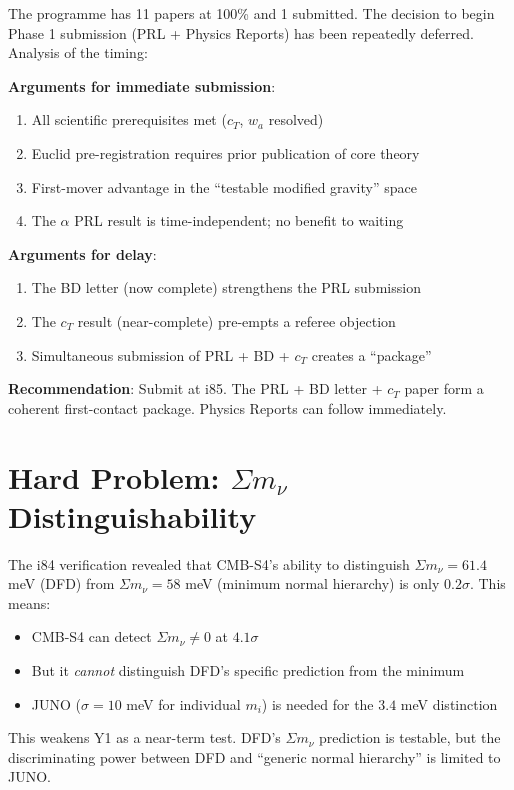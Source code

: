 \documentclass[11pt,a4paper]{article}
\begin{document}
The programme has 11 papers at 100\% and 1 submitted. The decision to begin Phase 1 submission (PRL + Physics Reports) has been repeatedly deferred. Analysis of the timing:

\textbf{Arguments for immediate submission}:
\begin{enumerate}[nosep]
\item All scientific prerequisites met ($c_T$, $w_a$ resolved)
\item Euclid pre-registration requires prior publication of core theory
\item First-mover advantage in the ``testable modified gravity'' space
\item The $\alpha$ PRL result is time-independent; no benefit to waiting
\end{enumerate}

\textbf{Arguments for delay}:
\begin{enumerate}[nosep]
\item The BD letter (now complete) strengthens the PRL submission
\item The $c_T$ result (near-complete) pre-empts a referee objection
\item Simultaneous submission of PRL + BD + $c_T$ creates a ``package''
\end{enumerate}

\textbf{Recommendation}: Submit at i85. The PRL + BD letter + $c_T$ paper form a coherent first-contact package. Physics Reports can follow immediately.

\section{Hard Problem: $\Sigma m_\nu$ Distinguishability}

The i84 verification revealed that CMB-S4's ability to distinguish $\Sigma m_\nu = 61.4$ meV (DFD) from $\Sigma m_\nu = 58$ meV (minimum normal hierarchy) is only $0.2\sigma$. This means:

\begin{itemize}[nosep]
\item CMB-S4 can detect $\Sigma m_\nu \neq 0$ at $4.1\sigma$
\item But it \emph{cannot} distinguish DFD's specific prediction from the minimum
\item JUNO ($\sigma = 10$ meV for individual $m_i$) is needed for the $3.4$ meV distinction
\end{itemize}

This weakens Y1 as a near-term test. DFD's $\Sigma m_\nu$ prediction is testable, but the discriminating power between DFD and ``generic normal hierarchy'' is limited to JUNO.
\end{document}
